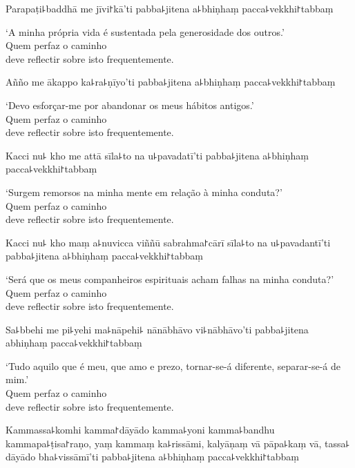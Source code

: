 Parapaṭi꜕baddhā me jīvi꜓kā'ti pabba꜕jitena a꜕bhiṇhaṃ pacca꜕vekkhi꜓tabbaṃ

\begin{english}
  `A minha própria vida é sustentada pela generosidade dos outros.'\\
  Quem perfaz o caminho\\
  deve reflectir sobre isto frequentemente.
\end{english}

Añño me ākappo ka꜕ra꜕ṇīyo'ti pabba꜕jitena a꜕bhiṇhaṃ pacca꜕vekkhi꜓tabbaṃ

\begin{english}
  `Devo esforçar-me por abandonar os meus hábitos antigos.'\\
  Quem perfaz o caminho\\
  deve reflectir sobre isto frequentemente.
\end{english}

\clearpage

Kacci nu꜕ kho me attā sīla꜕to na u꜕pavadatī'ti pabba꜕jitena a꜕bhiṇhaṃ pacca꜕vekkhi꜓tabbaṃ

\begin{english}
  `Surgem remorsos na minha mente em relação à minha conduta?'\\
  Quem perfaz o caminho\\
  deve reflectir sobre isto frequentemente.
\end{english}

Kacci nu꜕ kho maṃ a꜕nuvicca viññū sabrahma꜓cārī sīla꜕to na u꜕pavadantī'ti pabba꜕jitena a꜕bhiṇhaṃ pacca꜕vekkhi꜓tabbaṃ

\begin{english}
  `Será que os meus companheiros espirituais acham falhas na minha conduta?'\\
  Quem perfaz o caminho\\
  deve reflectir sobre isto frequentemente.
\end{english}

Sa꜕bbehi me pi꜕yehi ma꜕nāpehi꜕ nānābhāvo vi꜕nābhāvo'ti pabba꜕jitena abhiṇhaṃ pacca꜕vekkhi꜓tabbaṃ

\begin{english}
  `Tudo aquilo que é meu, que amo e prezo, tornar-se-á diferente, separar-se-á de mim.'\\
  Quem perfaz o caminho\\
  deve reflectir sobre isto frequentemente.
\end{english}

Kammassa꜕komhi kamma꜓dāyādo kamma꜕yoni kamma꜕bandhu kammapa꜕ṭisa꜓raṇo, yaṃ kammaṃ ka꜕rissāmi, kalyāṇaṃ vā pāpa꜕kaṃ vā, tassa꜕ dāyādo bha꜕vissāmī'ti pabba꜕jitena a꜕bhiṇhaṃ pacca꜕vekkhi꜓tabbaṃ

